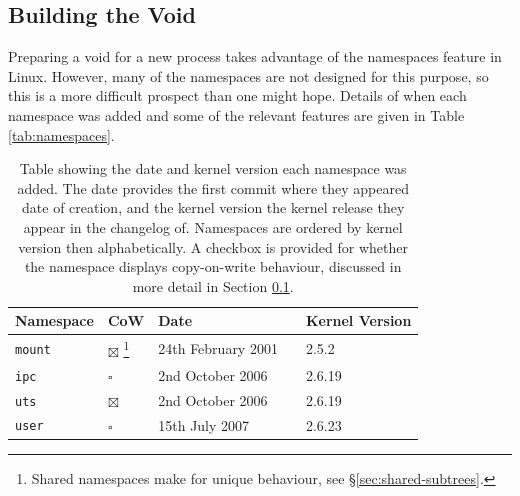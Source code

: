 \documentclass[sigplan]{acmart}
\begin{document}
\subsection{Building the Void}
\label{sec:building-the-void}

Preparing a void for a new process takes advantage of the namespaces feature in Linux. However, many of the namespaces are not designed for this purpose, so this is a more difficult prospect than one might hope. Details of when each namespace was added and some of the relevant features are given in Table \ref{tab:namespaces}.

\begin{table}
    \caption{Table showing the date and kernel version each namespace was added. The date provides the first commit where they appeared date of creation, and the kernel version the kernel release they appear in the changelog of. Namespaces are ordered by kernel version then alphabetically. A checkbox is provided for whether the namespace displays copy-on-write behaviour, discussed in more detail in Section \ref{sec:building-the-void}.}

    \begin{minipage}{\textwidth}
    \begin{center}
    \begin{tabular}{l|l|lc|lc}
        Namespace & CoW & \multicolumn{2}{l}{Date} & \multicolumn{2}{l}{Kernel Version} \\ \hline

        \texttt{mount}
            & $\boxtimes$ \footnote{Shared namespaces make for unique behaviour, see §\ref{sec:shared-subtrees}.}
            & 24th February 2001 & \citep{viro_patchcft_2001}
            & 2.5.2 & \citep{torvalds_linux_2002} \\

        \texttt{ipc}
            & $\square$
            & 2nd October 2006 & \citep{korotaev_patch_2006}
            & 2.6.19 & \citep{noauthor_linux_2006} \\

        \texttt{uts}
            & $\boxtimes$
            & 2nd October 2006 & \citep{hallyn_patch_2006}
            & 2.6.19 & \citep{noauthor_linux_2006} \\

        \texttt{user}
            & $\square$
            & 15th July 2007 & \citep{le_goater_user_2007}
            & 2.6.23 & \citep{noauthor_linux_2007} \\


\end{tabular}
\end{center}
\end{minipage}
\end{table}
\end{document}
